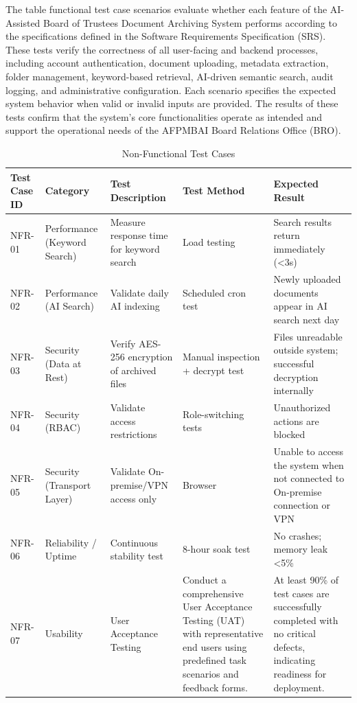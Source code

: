 The table functional test case scenarios evaluate whether each feature of the AI-Assisted Board of Trustees Document Archiving System performs according to the specifications defined in the Software Requirements Specification (SRS). These tests verify the correctness of all user-facing and backend processes, including account authentication, document uploading, metadata extraction, folder management, keyword-based retrieval, AI-driven semantic search, audit logging, and administrative configuration. Each scenario specifies the expected system behavior when valid or invalid inputs are provided. The results of these tests confirm that the system’s core functionalities operate as intended and support the operational needs of the AFPMBAI Board Relations Office (BRO).

\begin{table}[H]
\centering
\caption{Non-Functional Test Cases}
\footnotesize
\renewcommand{\arraystretch}{1.2}
\setlength{\tabcolsep}{5pt}
\begin{tabularx}{\textwidth}{|p{1.8cm}|p{2.5cm}|X|p{2.5cm}|p{3cm}|}
\hline
\textbf{Test Case ID} & \textbf{Category} & \textbf{Test Description} & \textbf{Test Method} & \textbf{Expected Result} \\ \hline

NFR-01 & Performance (Keyword Search) & Measure response time for keyword search & Load testing & Search results return immediately (<3s) \\ \hline

NFR-02 & Performance (AI Search) & Validate daily AI indexing & Scheduled cron test & Newly uploaded documents appear in AI search next day \\ \hline

NFR-03 & Security (Data at Rest) & Verify AES-256 encryption of archived files & Manual inspection + decrypt test & Files unreadable outside system; successful decryption internally \\ \hline

NFR-04 & Security (RBAC) & Validate access restrictions & Role-switching tests & Unauthorized actions are blocked \\ \hline

NFR-05 & Security (Transport Layer) & Validate On-premise/VPN access only & Browser & Unable to access the system when not connected to On-premise connection or VPN \\ \hline

NFR-06 & Reliability / Uptime & Continuous stability test & 8-hour soak test & No crashes; memory leak <5\% \\ \hline

NFR-07 & Usability & User Acceptance Testing & Conduct a comprehensive User Acceptance Testing (UAT) with representative end users using predefined task scenarios and feedback forms. & At least 90\% of test cases are successfully completed with no critical defects, indicating readiness for deployment. \\ \hline
\end{tabularx}
\end{table}

